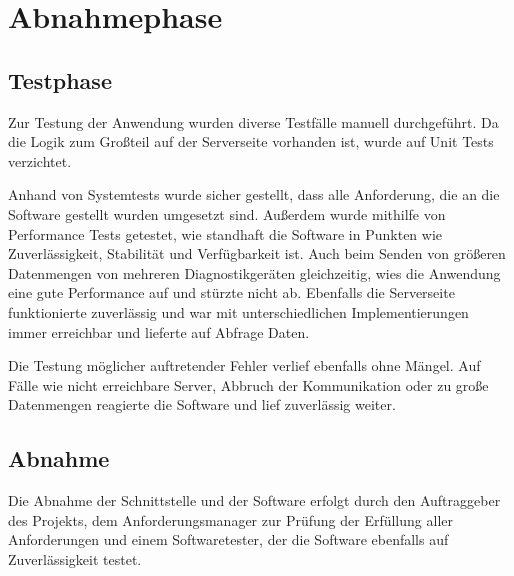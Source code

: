 \section{Abnahmephase}
\label{sec:Abnahmephase}

\subsection{Testphase}
\label{sec:Testphase}
Zur Testung der Anwendung wurden diverse Testfälle manuell durchgeführt. Da die Logik zum Großteil auf der Serverseite vorhanden ist, wurde auf Unit Tests verzichtet.

Anhand von Systemtests wurde sicher gestellt, dass alle Anforderung, die an die Software gestellt wurden umgesetzt sind. Außerdem wurde mithilfe von Performance Tests getestet, wie standhaft die Software in Punkten wie Zuverlässigkeit, Stabilität und Verfügbarkeit ist. Auch beim Senden von größeren Datenmengen von mehreren Diagnostikgeräten gleichzeitig, wies die Anwendung eine gute Performance auf und stürzte nicht ab. Ebenfalls die Serverseite funktionierte zuverlässig und war mit unterschiedlichen  Implementierungen immer erreichbar und lieferte auf Abfrage Daten.

Die Testung möglicher auftretender Fehler verlief ebenfalls ohne Mängel. Auf Fälle wie nicht erreichbare Server, Abbruch der Kommunikation oder zu große Datenmengen reagierte die Software und lief zuverlässig weiter.

\subsection{Abnahme}
\label{sec:Abnahme}
Die Abnahme der Schnittstelle und der Software erfolgt durch den Auftraggeber des Projekts, dem Anforderungsmanager zur Prüfung der Erfüllung aller Anforderungen und einem Softwaretester, der die Software ebenfalls auf Zuverlässigkeit testet.